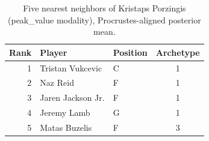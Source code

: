 \begin{table}[htbp]
  \centering\small
  \begin{tabular}{rllc}
    \toprule
    Rank & Player & Position & Archetype \\
    \midrule
    1 & Tristan Vukcevic & C & 1 \\
    2 & Naz Reid & F & 1 \\
    3 & Jaren Jackson Jr. & F & 1 \\
    4 & Jeremy Lamb & G & 1 \\
    5 & Matas Buzelis & F & 3 \\
    \bottomrule
  \end{tabular}
  \caption{Five nearest neighbors of Kristaps Porzingis (peak_value modality), Procrustes-aligned posterior mean.}
  \label{tab:Kristaps_Porzingis_neighbors_peak_value}
\end{table}

